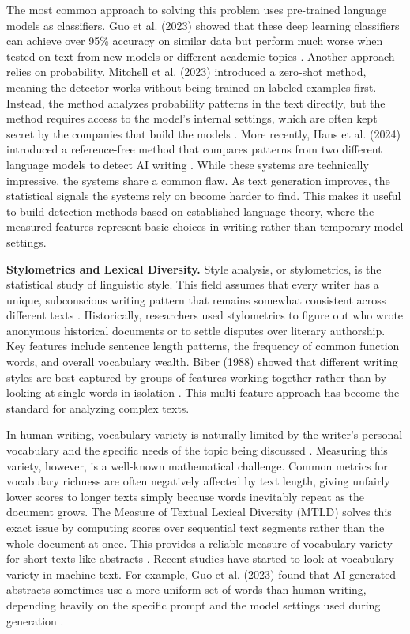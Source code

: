 \documentclass{article}
\begin{document}
The most common approach to solving this problem uses pre-trained language models as classifiers. Guo et al. (2023) showed that these deep learning classifiers can achieve over 95\% accuracy on similar data but perform much worse when tested on text from new models or different academic topics \cite{ref5}. Another approach relies on probability. Mitchell et al. (2023) introduced a zero-shot method, meaning the detector works without being trained on labeled examples first. Instead, the method analyzes probability patterns in the text directly, but the method requires access to the model's internal settings, which are often kept secret by the companies that build the models \cite{ref9}. More recently, Hans et al. (2024) introduced a reference-free method that compares patterns from two different language models to detect AI writing \cite{ref10}. While these systems are technically impressive, the systems share a common flaw. As text generation improves, the statistical signals the systems rely on become harder to find. This makes it useful to build detection methods based on established language theory, where the measured features represent basic choices in writing rather than temporary model settings.

\textbf{Stylometrics and Lexical Diversity.} Style analysis, or stylometrics, is the statistical study of linguistic style. This field assumes that every writer has a unique, subconscious writing pattern that remains somewhat consistent across different texts \cite{ref1,ref14}. Historically, researchers used stylometrics to figure out who wrote anonymous historical documents or to settle disputes over literary authorship. Key features include sentence length patterns, the frequency of common function words, and overall vocabulary wealth. Biber (1988) showed that different writing styles are best captured by groups of features working together rather than by looking at single words in isolation \cite{ref1}. This multi-feature approach has become the standard for analyzing complex texts.

In human writing, vocabulary variety is naturally limited by the writer's personal vocabulary and the specific needs of the topic being discussed \cite{ref3}. Measuring this variety, however, is a well-known mathematical challenge. Common metrics for vocabulary richness are often negatively affected by text length, giving unfairly lower scores to longer texts simply because words inevitably repeat as the document grows. The Measure of Textual Lexical Diversity (MTLD) solves this exact issue by computing scores over sequential text segments rather than the whole document at once. This provides a reliable measure of vocabulary variety for short texts like abstracts \cite{ref11,ref18}. Recent studies have started to look at vocabulary variety in machine text. For example, Guo et al. (2023) found that AI-generated abstracts sometimes use a more uniform set of words than human writing, depending heavily on the specific prompt and the model settings used during generation \cite{ref5}.
\end{document}
